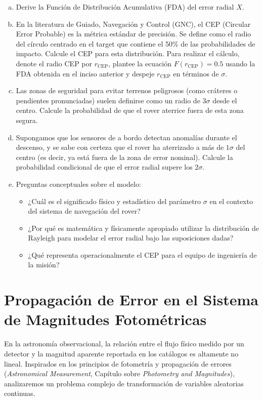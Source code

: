 \documentclass{article}
\begin{document}
\begin{enumerate}[a)]
    \item Derive la Función de Distribución Acumulativa (FDA) del error radial $X$.
    \item En la literatura de Guiado, Navegación y Control (GNC), el CEP (Circular Error Probable) es la métrica estándar de precisión. Se define como el radio del círculo centrado en el target que contiene el 50\% de las probabilidades de impacto. Calcule el CEP para esta distribución. Para realizar el cálculo, denote el radio CEP por $r_{\mathrm{CEP}}$, plantee la ecuación $F(r_{\mathrm{CEP}})=0.5$ usando la FDA obtenida en el inciso anterior y despeje $r_{\mathrm{CEP}}$ en términos de $\sigma$.
    \item Las zonas de seguridad para evitar terrenos peligrosos (como cráteres o pendientes pronunciadas) suelen definirse como un radio de $3\sigma$ desde el centro. Calcule la probabilidad de que el rover aterrice fuera de esta zona segura.
    \item Supongamos que los sensores de a bordo detectan anomalías durante el descenso, y se sabe con certeza que el rover ha aterrizado a más de $1\sigma$ del centro (es decir, ya está fuera de la zona de error nominal). Calcule la probabilidad condicional de que el error radial supere los $2\sigma$.
    \item Preguntas conceptuales sobre el modelo:
    \begin{itemize}
        \item ¿Cuál es el significado físico y estadístico del parámetro $\sigma$ en el contexto del sistema de navegación del rover?
        \item ¿Por qué es matemática y físicamente apropiado utilizar la distribución de Rayleigh para modelar el error radial bajo las suposiciones dadas?
        \item ¿Qué representa operacionalmente el CEP para el equipo de ingeniería de la misión?
    \end{itemize}
\end{enumerate}


\section{Propagación de Error en el Sistema de Magnitudes Fotométricas}

En la astronomía observacional, la relación entre el flujo físico medido por un detector y la magnitud aparente reportada en los catálogos es altamente no lineal. Inspirados en los principios de fotometría y propagación de errores (\textit{Astronomical Measurement}, Capítulo sobre \textit{Photometry and Magnitudes}), analizaremos un problema complejo de transformación de variables aleatorias continuas.
\end{document}
